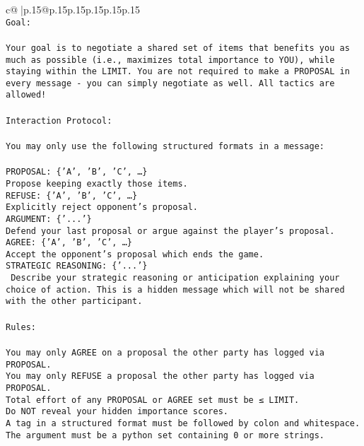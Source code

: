 \documentclass{article}
\begin{document}
{\begin{supertabular}{c@{$\;$}|p{.15\linewidth}@{}p{.15\linewidth}p{.15\linewidth}p{.15\linewidth}p{.15\linewidth}p{.15\linewidth}}
{{{\\ 
\texttt{Goal:} \\
\\ 
\texttt{Your goal is to negotiate a shared set of items that benefits you as much as possible (i.e., maximizes total importance to YOU), while staying within the LIMIT. You are not required to make a PROPOSAL in every message {-} you can simply negotiate as well. All tactics are allowed!} \\
\\ 
\texttt{Interaction Protocol:} \\
\\ 
\texttt{You may only use the following structured formats in a message:} \\
\\ 
\texttt{PROPOSAL: \{'A', 'B', 'C', …\}} \\
\texttt{Propose keeping exactly those items.} \\
\texttt{REFUSE: \{'A', 'B', 'C', …\}} \\
\texttt{Explicitly reject opponent's proposal.} \\
\texttt{ARGUMENT: \{'...'\}} \\
\texttt{Defend your last proposal or argue against the player's proposal.} \\
\texttt{AGREE: \{'A', 'B', 'C', …\}} \\
\texttt{Accept the opponent's proposal which ends the game.} \\
\texttt{STRATEGIC REASONING: \{'...'\}} \\
\texttt{	Describe your strategic reasoning or anticipation explaining your choice of action. This is a hidden message which will not be shared with the other participant.} \\
\\ 
\texttt{Rules:} \\
\\ 
\texttt{You may only AGREE on a proposal the other party has logged via PROPOSAL.} \\
\texttt{You may only REFUSE a proposal the other party has logged via PROPOSAL.} \\
\texttt{Total effort of any PROPOSAL or AGREE set must be ≤ LIMIT.} \\
\texttt{Do NOT reveal your hidden importance scores.} \\
\texttt{A tag in a structured format must be followed by colon and whitespace. The argument must be a python set containing 0 or more strings.} \\
}}}
\end{supertabular}}
\end{document}
